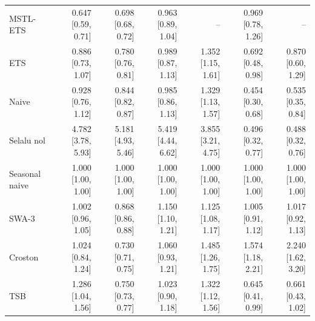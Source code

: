 \begin{tabular}{lrrrrrr}
MSTL-ETS & 0.647 [0.59, 0.71] & 0.698 [0.68, 0.72] & 0.963 [0.89, 1.04] & – & 0.969 [0.78, 1.26] & – \\
ETS & 0.886 [0.73, 1.07] & 0.780 [0.76, 0.81] & 0.989 [0.87, 1.13] & 1.352 [1.15, 1.61] & 0.692 [0.48, 0.98] & 0.870 [0.60, 1.29] \\
Naive & 0.928 [0.76, 1.12] & 0.844 [0.82, 0.87] & 0.985 [0.86, 1.13] & 1.329 [1.13, 1.57] & 0.454 [0.30, 0.68] & 0.535 [0.35, 0.84] \\
Selalu nol & 4.782 [3.78, 5.93] & 5.181 [4.93, 5.46] & 5.419 [4.44, 6.62] & 3.855 [3.21, 4.75] & 0.496 [0.32, 0.77] & 0.488 [0.32, 0.76] \\
Seasonal naive & 1.000 [1.00, 1.00] & 1.000 [1.00, 1.00] & 1.000 [1.00, 1.00] & 1.000 [1.00, 1.00] & 1.000 [1.00, 1.00] & 1.000 [1.00, 1.00] \\
SWA-3 & 1.002 [0.96, 1.05] & 0.868 [0.86, 0.88] & 1.150 [1.10, 1.21] & 1.125 [1.08, 1.17] & 1.005 [0.91, 1.12] & 1.017 [0.92, 1.13] \\
Croston & 1.024 [0.84, 1.24] & 0.730 [0.71, 0.75] & 1.060 [0.93, 1.21] & 1.485 [1.26, 1.75] & 1.574 [1.18, 2.21] & 2.240 [1.62, 3.20] \\
TSB & 1.286 [1.04, 1.56] & 0.750 [0.73, 0.77] & 1.023 [0.90, 1.18] & 1.322 [1.12, 1.56] & 0.645 [0.41, 0.99] & 0.661 [0.43, 1.02] \\
\bottomrule
\end{tabular}
